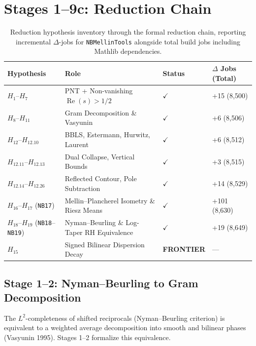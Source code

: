 \documentclass[11pt,a4paper]{article}
\theoremstyle{plain}
\theoremstyle{definition}
\theoremstyle{remark}
\DeclareMathOperator{\RePart}{Re}
\renewcommand{\Re}{\RePart}
\begin{document}
\section{Stages 1--9c: Reduction Chain}
\label{sec:stages}

\begin{table}[htbp]
\centering
\small
\begin{tabular}{llll}
\toprule
\textbf{Hypothesis} & \textbf{Role} & \textbf{Status} & \textbf{$\Delta$ Jobs (Total)} \\
\midrule
$H_1$--$H_7$ & PNT + Non-vanishing $\Re(s) > 1/2$ & $\checkmark$ & +15 (8,500) \\
$H_8$--$H_{11}$ & Gram Decomposition \& Vasyunin & $\checkmark$ & +6 (8,506) \\
$H_{12}$--$H_{12.10}$ & BBLS, Estermann, Hurwitz, Laurent & $\checkmark$ & +6 (8,512) \\
$H_{12.11}$--$H_{12.13}$ & Dual Collapse, Vertical Bounds & $\checkmark$ & +3 (8,515) \\
$H_{12.14}$--$H_{12.26}$ & Reflected Contour, Pole Subtraction & $\checkmark$ & +14 (8,529) \\
$H_{16}$--$H_{17}$ (\texttt{NB17}) & Mellin--Plancherel Isometry \& Riesz Means & $\checkmark$ & +101 (8,630) \\
$H_{18}$--$H_{19}$ (\texttt{NB18}--\texttt{NB19}) & Nyman--Beurling \& Log-Taper RH Equivalence & $\checkmark$ & +19 (8,649) \\
\midrule
$H_{15}$ & Signed Bilinear Dispersion Decay & \textbf{FRONTIER} & --- \\
\bottomrule
\end{tabular}
\caption{Reduction hypothesis inventory through the formal reduction chain, reporting incremental $\Delta$-jobs for \texttt{NBMellinTools} alongside total build jobs including Mathlib dependencies.}
\label{tab:h_inventory}
\end{table}

\subsection{Stage 1--2: Nyman--Beurling to Gram Decomposition}

The $L^2$-completeness of shifted reciprocals (Nyman--Beurling criterion) is equivalent to a weighted average decomposition into smooth and bilinear phases (Vasyunin 1995). Stages 1--2 formalize this equivalence.
\end{document}
